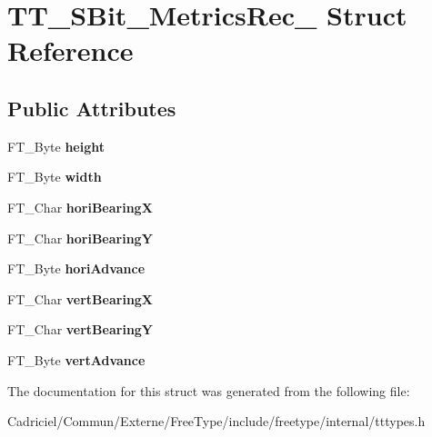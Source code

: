 \hypertarget{struct_t_t___s_bit___metrics_rec__}{\section{T\-T\-\_\-\-S\-Bit\-\_\-\-Metrics\-Rec\-\_\- Struct Reference}
\label{struct_t_t___s_bit___metrics_rec__}
}
\subsection*{Public Attributes}
\begin{DoxyCompactItemize}
\item 
\hypertarget{struct_t_t___s_bit___metrics_rec___a79b25794122888101aae80c7b74fc1fc}{F\-T\-\_\-\-Byte {\bfseries height}}\label{struct_t_t___s_bit___metrics_rec___a79b25794122888101aae80c7b74fc1fc}

\item 
\hypertarget{struct_t_t___s_bit___metrics_rec___a3444618e2c2a612a662a5e0d2c3f25ef}{F\-T\-\_\-\-Byte {\bfseries width}}\label{struct_t_t___s_bit___metrics_rec___a3444618e2c2a612a662a5e0d2c3f25ef}

\item 
\hypertarget{struct_t_t___s_bit___metrics_rec___a786ba1081993e18d514ddf37c2662c7b}{F\-T\-\_\-\-Char {\bfseries hori\-Bearing\-X}}\label{struct_t_t___s_bit___metrics_rec___a786ba1081993e18d514ddf37c2662c7b}

\item 
\hypertarget{struct_t_t___s_bit___metrics_rec___aaed1567b444a1bee4b3478b2cdb9259f}{F\-T\-\_\-\-Char {\bfseries hori\-Bearing\-Y}}\label{struct_t_t___s_bit___metrics_rec___aaed1567b444a1bee4b3478b2cdb9259f}

\item 
\hypertarget{struct_t_t___s_bit___metrics_rec___a8b0c5271aaf220f7a8cbf4838854e220}{F\-T\-\_\-\-Byte {\bfseries hori\-Advance}}\label{struct_t_t___s_bit___metrics_rec___a8b0c5271aaf220f7a8cbf4838854e220}

\item 
\hypertarget{struct_t_t___s_bit___metrics_rec___a626e67e02494faab653a7543bb0b7c79}{F\-T\-\_\-\-Char {\bfseries vert\-Bearing\-X}}\label{struct_t_t___s_bit___metrics_rec___a626e67e02494faab653a7543bb0b7c79}

\item 
\hypertarget{struct_t_t___s_bit___metrics_rec___aef4755ed22ba72e5fa304920bae03146}{F\-T\-\_\-\-Char {\bfseries vert\-Bearing\-Y}}\label{struct_t_t___s_bit___metrics_rec___aef4755ed22ba72e5fa304920bae03146}

\item 
\hypertarget{struct_t_t___s_bit___metrics_rec___a947468e42759089d0b5c5fa10a0defdf}{F\-T\-\_\-\-Byte {\bfseries vert\-Advance}}\label{struct_t_t___s_bit___metrics_rec___a947468e42759089d0b5c5fa10a0defdf}

\end{DoxyCompactItemize}


The documentation for this struct was generated from the following file\-:\begin{DoxyCompactItemize}
\item 
Cadriciel/\-Commun/\-Externe/\-Free\-Type/include/freetype/internal/tttypes.\-h\end{DoxyCompactItemize}
